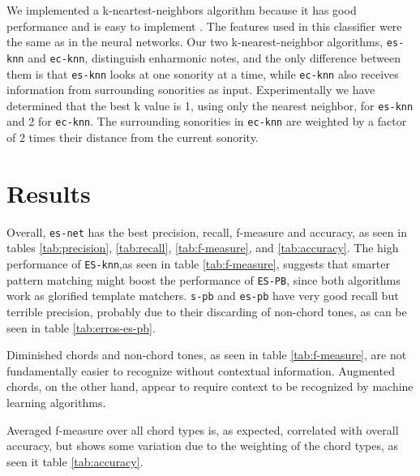 \documentclass{article}
\begin{document}
We implemented a k-neartest-neighbors algorithm because it has good
performance and is easy to implement \cite{fix.ea89:important,
  gomez.ea04:estimating}. The features used in this classifier were the
same as in the neural networks. Our two k-nearest-neighbor algorithms,
\texttt{es-knn} and \texttt{ec-knn}, distinguish enharmonic notes, and
the only difference between them is that \texttt{es-knn} looks at one
sonority at a time, while \texttt{ec-knn} also receives information
from surrounding sonorities as input. Experimentally we have
determined that the best k value is 1, using only the nearest
neighbor, for \texttt{es-knn} and 2 for \texttt{ec-knn}. The
surrounding sonorities in \texttt{ec-knn} are weighted by a factor of
2 times their distance from the current sonority.

\section{Results}
\label{sec:discussion}


Overall, \texttt{es-net} has the best precision, recall, f-measure and
accuracy, as seen in tables \ref{tab:precision}, \ref{tab:recall},
\ref{tab:f-measure}, and \ref{tab:accuracy}. The high performance of
\texttt{ES-knn},as seen in table \ref{tab:f-measure}, suggests that
smarter pattern matching might boost the performance of \texttt{ES-PB}, since
both algorithms work as glorified template matchers. \texttt{s-pb} and
\texttt{es-pb} have very good recall but terrible precision, probably
due to their discarding of non-chord tones, as can be seen in table
\ref{tab:erros-es-pb}.


Diminished chords and
non-chord tones, as seen in table \ref{tab:f-measure}, are not
fundamentally easier to recognize without contextual
information. Augmented chords, on the other hand, appear to require
context to be recognized by machine learning algorithms.


Averaged f-measure over all chord types is, as expected, correlated
with overall accuracy, but shows some variation due to the weighting
of the chord types, as seen it table \ref{tab:accuracy}.
\end{document}
